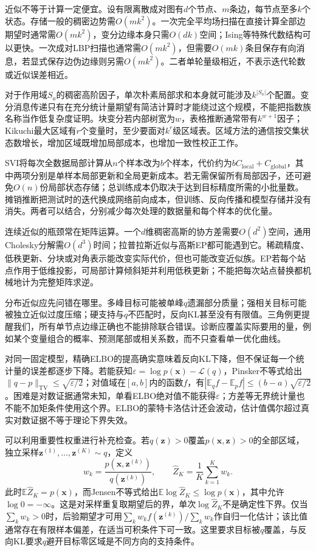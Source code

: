 近似不等于计算一定便宜。设有限离散成对图有$d$个节点、$m$条边，每节点至多$k$个状态。存储一般的稠密边势需$O(mk^2)$。一次完全平均场扫描在直接计算全部边期望时通常需$O(mk^2)$，变分边缘本身只需$O(dk)$空间；Ising等特殊代数结构可以更快。一次成对LBP扫描也通常需$O(mk^2)$，但需要$O(mk)$条目保存有向消息，若显式保存边伪边缘则另需$O(mk^2)$。二者单轮量级相近，不表示迭代轮数或近似误差相近。

对于作用域$S_a$的稠密高阶因子，单次朴素局部求和本身就可能涉及$k^{|S_a|}$个配置。变分消息传递只有在充分统计量期望有简洁计算时才能绕过这个规模，不能把指数族名称当作低复杂度证明。块变分若内部树宽为$w$，表格推断通常带有$k^{w+1}$因子；Kikuchi最大区域有$r$个变量时，至少要面对$k^r$级区域表。区域方法的通信按交集状态数增长，增加区域既增加局部成本，也增加一致性校正工作。

SVI将每次全数据局部计算从$n$个样本改为$b$个样本，代价约为$bC_{\mathrm{local}}+C_{\mathrm{global}}$，其中两项分别是单样本局部更新和全局更新成本。若无需保留所有局部因子，还可避免$O(n)$份局部状态存储；总训练成本仍取决于达到目标精度所需的小批量数。摊销推断把测试时的迭代换成网络前向成本，但训练、反向传播和模型存储并没有消失。两者可以结合，分别减少每次处理的数据量和每个样本的优化量。

连续近似的瓶颈常在矩阵运算。一个$d$维稠密高斯的协方差需要$O(d^2)$空间，通用Cholesky分解需$O(d^3)$时间；拉普拉斯近似与高斯EP都可能遇到它。稀疏精度、低秩更新、分块或对角表示能改变实际代价，但也可能改变近似族。EP若每个站点作用于低维投影，可局部计算倾斜矩并利用低秩更新；不能把每次站点替换都机械地计为完整矩阵求逆。

分布近似应先问错在哪里。多峰目标可能被单峰$q$遗漏部分质量；强相关目标可能被独立近似过度压缩；硬支持与$q$不匹配时，反向KL甚至没有有限值。三角例更提醒我们，所有单节点边缘正确也不能排除联合错误。诊断应覆盖实际要用的量，例如某个变量组合的概率、预测尾部或相关系数，而不只查看单一优化曲线。

对同一固定模型，精确ELBO的提高确实意味着反向KL下降，但不保证每一个统计量的误差都逐步下降。若能获知$\varepsilon=\log p(\bm x)-\mathcal L(q)$，Pinsker不等式给出$\|q-p\|_{\mathrm{TV}}\leq\sqrt{\varepsilon/2}$；对值域在$[a,b]$内的函数$f$，有$|\mathbb E_qf-\mathbb E_pf|\leq(b-a)\sqrt{\varepsilon/2}$。困难是对数证据通常未知，单看ELBO绝对值不能获得$\varepsilon$；方差等无界统计量也不能不加矩条件使用这个界。ELBO的蒙特卡洛估计还会波动，估计值偶尔超过真实对数证据不等于理论下界失效。

可以利用重要性权重进行补充检查。若$q(\bm z)>0$覆盖$p(\bm x,\bm z)>0$的全部区域，独立采样$\bm z^{(1)},\ldots,\bm z^{(K)}\sim q$，定义
\begin{equation}
  w_k=\frac{p(\bm x,\bm z^{(k)})}{q(\bm z^{(k)})},
  \qquad
  \widehat Z_K=\frac1K\sum_{k=1}^K w_k.
  \label{eq:pgm-variational-importance}
\end{equation}
此时$\mathbb E\widehat Z_K=p(\bm x)$，而Jensen不等式给出$\mathbb E\log\widehat Z_K\leq\log p(\bm x)$，其中允许$\log0=-\infty$。这是对采样重复取期望后的界，单次$\log\widehat Z_K$不是确定性下界。仅当$\sum_kw_k>0$时，后验期望才可用$\sum_kw_kf(\bm z^{(k)})/\sum_kw_k$作自归一化估计；该比值通常存在有限样本偏差，在适当可积条件下可一致。这里要求目标被$q$覆盖，与反向KL要求$q$避开目标零区域是不同方向的支持条件。

